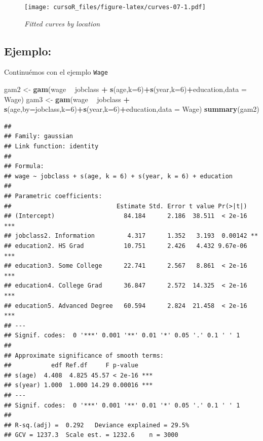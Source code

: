 \documentclass[]{book}
\newenvironment{Shaded}{\begin{snugshade}}{\end{snugshade}}
\newcommand{\KeywordTok}[1]{\textcolor[rgb]{0.13,0.29,0.53}{\textbf{#1}}}
\newcommand{\DataTypeTok}[1]{\textcolor[rgb]{0.13,0.29,0.53}{#1}}
\newcommand{\DecValTok}[1]{\textcolor[rgb]{0.00,0.00,0.81}{#1}}
\newcommand{\StringTok}[1]{\textcolor[rgb]{0.31,0.60,0.02}{#1}}
\newcommand{\OperatorTok}[1]{\textcolor[rgb]{0.81,0.36,0.00}{\textbf{#1}}}
\newcommand{\NormalTok}[1]{#1}
\begin{document}
\begin{figure}
\centering
\texttt{[image: cursoR\_files/figure-latex/curves-07-1.pdf]}
\caption{\label{fig:curves-07}\emph{Fitted curves by location}}
\end{figure}

\subsection{Ejemplo:}\label{ejemplo}

Continuémos con el ejemplo \texttt{Wage}

\begin{Shaded}
\begin{Highlighting}[]
\NormalTok{gam2 <-}\StringTok{ }\KeywordTok{gam}\NormalTok{(wage }\OperatorTok{~}\StringTok{ }\NormalTok{jobclass }\OperatorTok{+}\StringTok{ }\KeywordTok{s}\NormalTok{(age,}\DataTypeTok{k=}\DecValTok{6}\NormalTok{)}\OperatorTok{+}\KeywordTok{s}\NormalTok{(year,}\DataTypeTok{k=}\DecValTok{6}\NormalTok{)}\OperatorTok{+}\NormalTok{education,}\DataTypeTok{data =}\NormalTok{ Wage)}
\NormalTok{gam3 <-}\StringTok{ }\KeywordTok{gam}\NormalTok{(wage }\OperatorTok{~}\StringTok{ }\NormalTok{jobclass }\OperatorTok{+}\StringTok{ }\KeywordTok{s}\NormalTok{(age,}\DataTypeTok{by=}\NormalTok{jobclass,}\DataTypeTok{k=}\DecValTok{6}\NormalTok{)}\OperatorTok{+}\KeywordTok{s}\NormalTok{(year,}\DataTypeTok{k=}\DecValTok{6}\NormalTok{)}\OperatorTok{+}\NormalTok{education,}\DataTypeTok{data =}\NormalTok{ Wage)}
\KeywordTok{summary}\NormalTok{(gam2)}
\end{Highlighting}
\end{Shaded}

\begin{verbatim}
## 
## Family: gaussian 
## Link function: identity 
## 
## Formula:
## wage ~ jobclass + s(age, k = 6) + s(year, k = 6) + education
## 
## Parametric coefficients:
##                             Estimate Std. Error t value Pr(>|t|)    
## (Intercept)                   84.184      2.186  38.511  < 2e-16 ***
## jobclass2. Information         4.317      1.352   3.193  0.00142 ** 
## education2. HS Grad           10.751      2.426   4.432 9.67e-06 ***
## education3. Some College      22.741      2.567   8.861  < 2e-16 ***
## education4. College Grad      36.847      2.572  14.325  < 2e-16 ***
## education5. Advanced Degree   60.594      2.824  21.458  < 2e-16 ***
## ---
## Signif. codes:  0 '***' 0.001 '**' 0.01 '*' 0.05 '.' 0.1 ' ' 1
## 
## Approximate significance of smooth terms:
##           edf Ref.df     F p-value    
## s(age)  4.408  4.825 45.57 < 2e-16 ***
## s(year) 1.000  1.000 14.29 0.00016 ***
## ---
## Signif. codes:  0 '***' 0.001 '**' 0.01 '*' 0.05 '.' 0.1 ' ' 1
## 
## R-sq.(adj) =  0.292   Deviance explained = 29.5%
## GCV = 1237.3  Scale est. = 1232.6    n = 3000
\end{verbatim}
\end{document}
